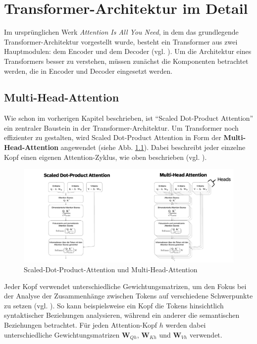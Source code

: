 \chapter{Transformer-Architektur im Detail}

Im ursprünglichen Werk \textit{Attention Is All You Need}, in dem das grundlegende Transformer-Architektur vorgestellt wurde, besteht ein Transformer aus zwei Hauptmodulen: dem Encoder und dem Decoder (vgl. \cite[S. 3]{attention}).
Um die Architektur eines Transformers besser zu verstehen, müssen zunächst die Komponenten betrachtet werden, die in Encoder und Decoder eingesetzt werden.

\section{Multi-Head-Attention}

Wie schon im vorherigen Kapitel beschrieben, ist \enquote{Scaled Dot-Product Attention} ein zentraler Baustein in der Transformer-Architektur.  
Um Transformer noch effizienter zu gestalten, wird Scaled Dot-Product Attention in Form der \textbf{Multi-Head-Attention} angewendet (siehe Abb. \ref{fig:multihead}). 
Dabei beschreibt jeder einzelne Kopf einen eigenen Attention-Zyklus, wie oben beschrieben (vgl. \cite[S. 211]{paass.2020}).

\begin{figure}[ht]
	\centering
	\includegraphics[width=1.0\textwidth]{Bilder/multihead.png} 
	\caption{Scaled-Dot-Product-Attention und Multi-Head-Attention}
	\label{fig:multihead}
\end{figure}

Jeder Kopf verwendet unterschiedliche Gewichtungsmatrizen, um den Fokus bei der Analyse der Zusammenhänge zwischen Tokens auf verschiedene Schwerpunkte zu setzen (vgl. \cite[S. 5]{attention}).  
So kann beispielsweise ein Kopf die Tokens hinsichtlich syntaktischer Beziehungen analysieren, während ein anderer die semantischen Beziehungen betrachtet.  
Für jeden Attention-Kopf \( h \) werden dabei unterschiedliche Gewichtungsmatrizen \( \mathbf{W}_{Qh} \), \( \mathbf{W}_{Kh} \) und \( \mathbf{W}_{Vh} \) verwendet.

